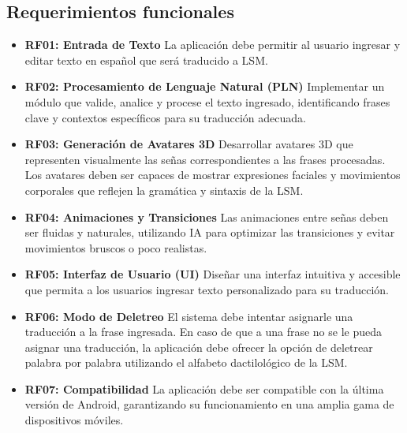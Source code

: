 \subsection{Requerimientos funcionales}
\begin{itemize}
    \item \textbf{RF01: Entrada de Texto}  
    La aplicación debe permitir al usuario ingresar y editar texto en español que será traducido a LSM.
    
    \item \textbf{RF02: Procesamiento de Lenguaje Natural (PLN)}  
    Implementar un módulo que valide, analice y procese el texto ingresado, identificando frases clave y contextos específicos para su traducción adecuada.
    
    \item \textbf{RF03: Generación de Avatares 3D}  
    Desarrollar avatares 3D que representen visualmente las señas correspondientes a las frases procesadas. Los avatares deben ser capaces de mostrar expresiones faciales y movimientos corporales que reflejen la gramática y sintaxis de la LSM.
    
    \item \textbf{RF04: Animaciones y Transiciones}  
    Las animaciones entre señas deben ser fluidas y naturales, utilizando IA para optimizar las transiciones y evitar movimientos bruscos o poco realistas.
    
    \item \textbf{RF05: Interfaz de Usuario (UI)}  
    Diseñar una interfaz intuitiva y accesible que permita a los usuarios ingresar texto personalizado para su traducción.
    
    \item \textbf{RF06: Modo de Deletreo}  
    El sistema debe intentar asignarle una traducción a la frase ingresada. En caso de que a una frase no se le pueda asignar una traducción, la aplicación debe ofrecer la opción de deletrear palabra por palabra utilizando el alfabeto dactilológico de la LSM.
    
    \item \textbf{RF07: Compatibilidad}  
    La aplicación debe ser compatible con la última versión de Android, garantizando su funcionamiento en una amplia gama de dispositivos móviles.
\end{itemize}


